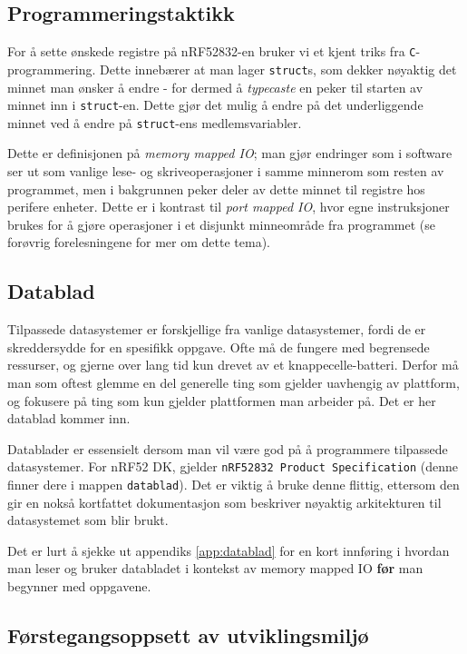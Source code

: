 \begin{alphasection}
\subsection{Programmeringstaktikk}

For å sette ønskede registre på nRF52832-en bruker vi et kjent triks fra \verb|C|-programmering. Dette innebærer at man lager \verb|struct|s, som dekker nøyaktig det minnet man ønsker å endre - for dermed å \textit{typecaste} en peker til starten av minnet inn i \verb|struct|-en. Dette gjør det mulig å endre på det underliggende minnet ved å endre på \verb|struct|-ens medlemsvariabler.

Dette er definisjonen på \textit{memory mapped IO}; man gjør endringer som i software ser ut som vanlige lese- og skriveoperasjoner i samme minnerom som resten av programmet, men i bakgrunnen peker deler av dette minnet til registre hos perifere enheter. Dette er i kontrast til \textit{port mapped IO}, hvor egne instruksjoner brukes for å gjøre operasjoner i et disjunkt minneområde fra programmet (se forøvrig forelesningene for mer om dette tema).

\subsection{Datablad}


Tilpassede datasystemer er forskjellige fra vanlige datasystemer, fordi de er skreddersydde for en spesifikk oppgave. Ofte må de fungere med begrensede ressurser, og gjerne over lang tid kun drevet av et knappecelle-batteri. Derfor må man som oftest glemme en del generelle ting som gjelder uavhengig av plattform, og fokusere på ting som kun gjelder plattformen man arbeider på. Det er her datablad kommer inn.

Datablader er essensielt dersom man vil være god på å programmere tilpassede datasystemer. For nRF52 DK, gjelder \texttt{nRF52832 Product Specification} (denne finner dere i mappen \verb|datablad|). Det er viktig å bruke denne flittig, ettersom den gir en nokså kortfattet dokumentasjon som beskriver nøyaktig arkitekturen til datasystemet som blir brukt.

Det er lurt å sjekke ut appendiks \ref{app:datablad} for en kort innføring i hvordan man leser og bruker databladet i kontekst av memory mapped IO {\bf før} man begynner med oppgavene.




\subsection{Førstegangsoppsett av utviklingsmiljø}



\end{alphasection}
